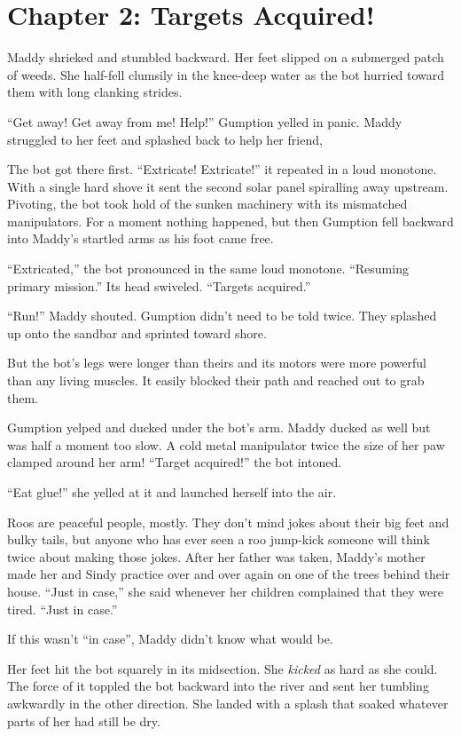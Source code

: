 \documentclass[10pt]{article}
\begin{document}
\newpage
\section{Chapter 2: Targets Acquired!}

Maddy shrieked and stumbled backward. Her feet slipped on a submerged
patch of weeds. She half-fell clumsily in the knee-deep water as the bot
hurried toward them with long clanking strides.

``Get away! Get away from me! Help!'' Gumption yelled in panic. Maddy
struggled to her feet and splashed back to help her friend,

The bot got there first. ``Extricate! Extricate!'' it repeated in a loud
monotone. With a single hard shove it sent the second solar panel
spiralling away upstream. Pivoting, the bot took hold of the sunken
machinery with its mismatched manipulators. For a moment nothing
happened, but then Gumption fell backward into Maddy's startled arms as
his foot came free.

``Extricated,'' the bot pronounced in the same loud monotone. ``Resuming
primary mission.'' Its head swiveled. ``Targets acquired.''

``Run!'' Maddy shouted. Gumption didn't need to be told twice. They
splashed up onto the sandbar and sprinted toward shore.

But the bot's legs were longer than theirs and its motors were more
powerful than any living muscles. It easily blocked their path and
reached out to grab them.

Gumption yelped and ducked under the bot's arm. Maddy ducked as well but
was half a moment too slow. A cold metal manipulator twice the size of
her paw clamped around her arm! ``Target acquired!'' the bot intoned.

``Eat glue!'' she yelled at it and launched herself into the air.

Roos are peaceful people, mostly. They don't mind jokes about their big
feet and bulky tails, but anyone who has ever seen a roo jump-kick
someone will think twice about making those jokes. After her father was
taken, Maddy's mother made her and Sindy practice over and over again on
one of the trees behind their house. ``Just in case,'' she said whenever
her children complained that they were tired. ``Just in case.''

If this wasn't ``in case'', Maddy didn't know what would be.

Her feet hit the bot squarely in its midsection. She \emph{kicked} as
hard as she could. The force of it toppled the bot backward into the
river and sent her tumbling awkwardly in the other direction. She landed
with a splash that soaked whatever parts of her had still be dry.
\end{document}
